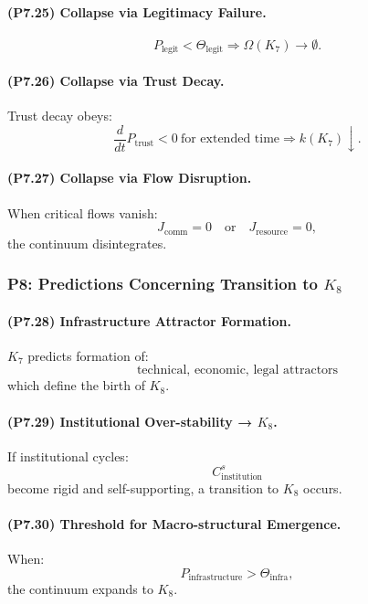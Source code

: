 \paragraph{(P7.25) Collapse via Legitimacy Failure.}
\[
P_{\mathrm{legit}} < \Theta_{\mathrm{legit}}
\Rightarrow
\Omega(K_7) \to \emptyset.
\]

\paragraph{(P7.26) Collapse via Trust Decay.}
Trust decay obeys:
\[
\frac{d}{dt} P_{\mathrm{trust}} < 0 \ \text{for extended time}
\Rightarrow
k(K_7) \downarrow.
\]

\paragraph{(P7.27) Collapse via Flow Disruption.}
When critical flows vanish:
\[
J_{\mathrm{comm}} = 0
\quad \text{or} \quad
J_{\mathrm{resource}} = 0,
\]
the continuum disintegrates.

\subsubsection{P8: Predictions Concerning Transition to \texorpdfstring{$K_8$}{K_8}}

\paragraph{(P7.28) Infrastructure Attractor Formation.}
$K_7$ predicts formation of:
\[
\text{technical, economic, legal attractors}
\]
which define the birth of $K_8$.

\paragraph{(P7.29) Institutional Over-stability → \texorpdfstring{$K_8$}{K_8}.}
If institutional cycles:
\[
C_{\mathrm{institution}}^s
\]
become rigid and self-supporting, a transition to $K_8$ occurs.

\paragraph{(P7.30) Threshold for Macro-structural Emergence.}
When:
\[
P_{\mathrm{infrastructure}} > \Theta_{\mathrm{infra}},
\]
the continuum expands to $K_8$.

